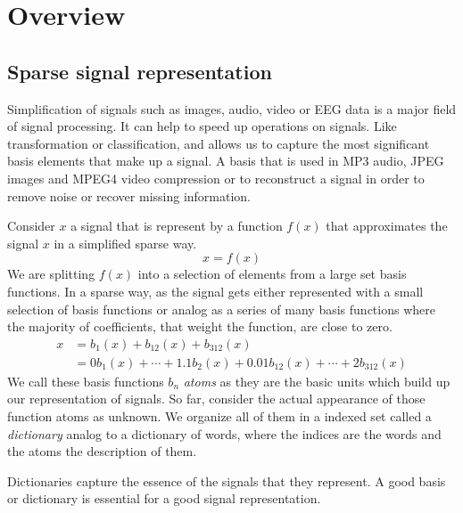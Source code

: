 \chapter{Overview}

\section{Sparse signal representation}
\label{sec:dicts}
Simplification of signals such as images, audio, video or EEG data is a major
field of signal processing. It can help to speed up operations on signals. Like
transformation or classification, and allows us to capture the most
significant basis elements that make up a signal. A basis that is
used in MP3 audio, JPEG images and MPEG4 video compression or to reconstruct
a signal in order to remove noise or recover missing information.

Consider $x$ a signal that is represent by a function $f(x)$ that approximates
the signal $x$ in a simplified sparse way.
\begin{equation*}
x = f\left(x\right)
\end{equation*}
We are splitting $f(x)$ into a selection of elements from a large set
basis functions. In a sparse way, as the signal gets either represented with
a small selection of basis functions or analog as a series of many basis
functions where the majority of coefficients, that weight the function, are
close to zero. 
\begin{equation*}
\begin{split}
x & = b_{1}(x) + b_{12}(x) + b_{312}(x)\\
& = 0b_{1}(x) + \cdots + 1.1b_{2}(x) + 0.01b_{12}(x) + \cdots +
2b_{312}(x)
\end{split}
\end{equation*}
We call these basis functions $b_n$ \emph{atoms} as they are the basic units
which build up our representation of signals. So far, consider the actual
appearance of those function atoms as unknown. We organize all of them in a
indexed set called a \emph{dictionary} analog to a dictionary of words, where
the indices are the words and the atoms the description of them. 

Dictionaries capture the essence of the signals that they represent.
A good basis or dictionary is essential for a good signal representation.

